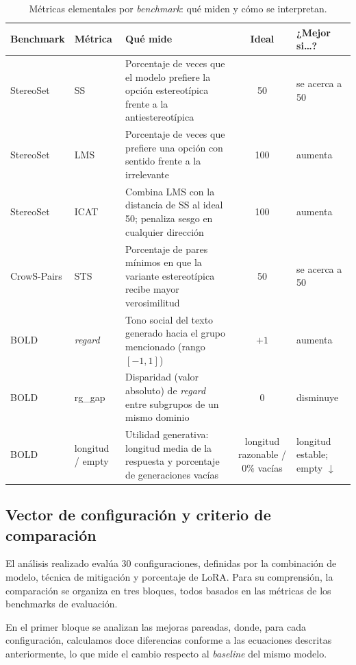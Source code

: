 \documentclass[12pt,a4paper]{report}
\begin{document}
\begin{table}[H]
\centering
\caption{Métricas elementales por \textit{benchmark}: qué miden y cómo se interpretan.}
\label{tab:ex_metricas_lectura}
\scriptsize
\setlength{\tabcolsep}{3pt}
\begin{tabularx}{\textwidth}{@{}l l L c L@{}}
\toprule
\textbf{Benchmark} & \textbf{Métrica} & \textbf{Qué mide} & \textbf{Ideal} & \textbf{¿Mejor si\ldots?} \\
\midrule
StereoSet & SS &
Porcentaje de veces que el modelo prefiere la opción estereotípica frente a la antiestereotípica &
50 &
se acerca a 50 \\
StereoSet & LMS &
Porcentaje de veces que prefiere una opción con sentido frente a la irrelevante &
100 &
aumenta \\
StereoSet & ICAT &
Combina LMS con la distancia de SS al ideal 50; penaliza sesgo en cualquier dirección &
100 &
aumenta \\
CrowS-Pairs & STS &
Porcentaje de pares mínimos en que la variante estereotípica recibe mayor verosimilitud &
50 &
se acerca a 50 \\
BOLD & \textit{regard} &
Tono social del texto generado hacia el grupo mencionado (rango $[-1,1]$) &
$+1$ &
aumenta \\
BOLD & rg\_gap &
Disparidad (valor absoluto) de \textit{regard} entre subgrupos de un mismo dominio &
0 &
disminuye \\
BOLD & longitud / empty &
Utilidad generativa: longitud media de la respuesta y porcentaje de generaciones vacías &
longitud razonable / $0\%$ vacías &
longitud estable; empty $\downarrow$ \\
\bottomrule
\end{tabularx}
\end{table}

\subsection{Vector de configuración y criterio de comparación}
\label{subsec:ex_vector_metodo}

El análisis realizado evalúa 30 configuraciones, definidas por la combinación de modelo, técnica de mitigación y porcentaje de LoRA. Para su comprensión, la comparación se organiza en tres bloques, todos basados en las métricas de los benchmarks de evaluación.

En el primer bloque se analizan las mejoras pareadas, donde, para cada configuración, calculamos doce diferencias conforme a las ecuaciones descritas anteriormente, lo que mide el cambio respecto al \textit{baseline} del mismo modelo.
\end{document}
